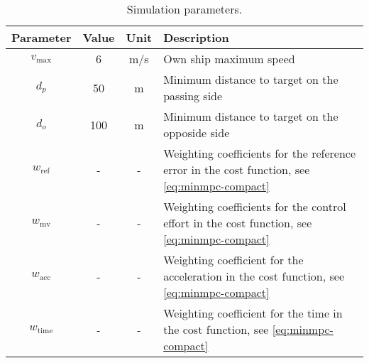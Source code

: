 \renewcommand{\arraystretch}{1.2}
\begin{table}[htbp]
    \centering
    \begin{tabular}{|c|c|c|p{7cm}|}
        \hline
        \textbf{Parameter} & \textbf{Value} & \textbf{Unit} & \textbf{Description} \\
        \hline
        \rule{0pt}{2.5ex}$v_\text{max}$ & 6 & m/s & Own ship maximum speed \\
        \hline
        \rule{0pt}{2.5ex}$d_p$ & 50 & m & Minimum distance to target on the passing side \\
        \hline
        \rule{0pt}{2.5ex}$d_o$ & 100 & m & Minimum distance to target on the opposide side \\
        \hline
        \rule{0pt}{2.5ex}$w_\text{ref}$ & - & - & Weighting coefficients for the reference error in the cost function, see \cref{eq:minmpc-compact} \\
        \hline
        \rule{0pt}{2.5ex}$w_\text{mv}$ & - & - & Weighting coefficients for the control effort in the cost function, see \cref{eq:minmpc-compact} \\
        \hline
        \rule{0pt}{2.5ex}$w_\text{acc}$ & - & - & Weighting coefficient for the acceleration in the cost function, see \cref{eq:minmpc-compact} \\
        \rule{0pt}{2.5ex}$w_\text{time}$ & - & - & Weighting coefficient for the time in the cost function, see \cref{eq:minmpc-compact} \\
        \hline
    \end{tabular}
    \caption{Simulation parameters.}
    \label{tab:simulation-parameters}
\end{table}
\renewcommand{\arraystretch}{1.0}

